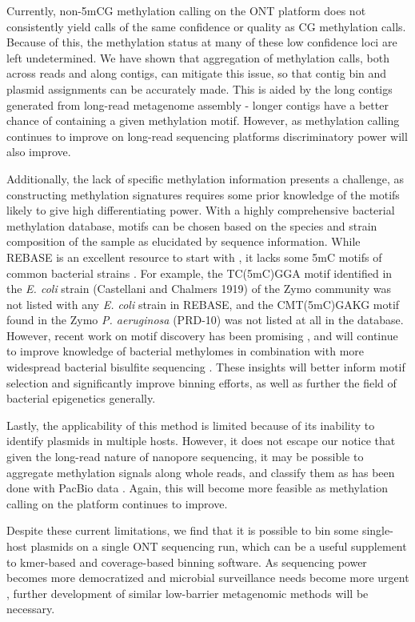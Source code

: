 Currently, non-5mCG methylation calling on the ONT platform does not consistently yield calls of the same confidence or quality as CG methylation calls. Because of this, the methylation status at many of these low confidence loci are left undetermined. We have shown that aggregation of methylation calls, both across reads and along contigs, can mitigate this issue, so that contig bin and plasmid assignments can be accurately made. This is aided by the long contigs generated from long-read metagenome assembly - longer contigs have a better chance of containing a given methylation motif. However, as methylation calling continues to improve on long-read sequencing platforms discriminatory power will also improve.

Additionally, the lack of specific methylation information presents a challenge, as constructing methylation signatures requires some prior knowledge of the motifs likely to give high differentiating power. With a highly comprehensive bacterial methylation database, motifs can be chosen based on the species and strain composition of the sample as elucidated by sequence information. While REBASE is an excellent resource to start with \citep{Roberts2003-ss}, it lacks some 5mC motifs of common bacterial strains \citep{Tourancheau2021-hv}. For example, the TC(5mC)GGA motif identified in the \textit{E. coli} strain (Castellani and Chalmers 1919) of the Zymo community was not listed with any \textit{E. coli} strain in REBASE, and the CMT(5mC)GAKG motif found in the Zymo \textit{\textit{P. aeruginosa}} (PRD-10) was not listed at all in the database. However, recent work on motif discovery has been promising \citep{Tourancheau2021-hv, Beaulaurier2018-mu}, and will continue to improve knowledge of bacterial methylomes in combination with more widespread bacterial bisulfite sequencing \citep{Oliveira_Pedro_H2021-rs}. These insights will better inform motif selection and significantly improve binning efforts, as well as further the field of bacterial epigenetics generally.

Lastly, the applicability of this method is limited because of its inability to identify plasmids in multiple hosts. However, it does not escape our notice that given the long-read nature of nanopore sequencing, it may be possible to aggregate methylation signals along whole reads, and classify them as has been done with PacBio data \citep{Beaulaurier2018-mu}. Again, this will become more feasible as methylation calling on the platform continues to improve.

Despite these current limitations, we find that it is possible to bin some single-host plasmids on a single ONT sequencing run, which can be a useful supplement to kmer-based and coverage-based binning software. As sequencing power becomes more democratized and microbial surveillance needs become more urgent \citep{Iskandar2021-eg}, further development of similar low-barrier metagenomic methods will be necessary.


